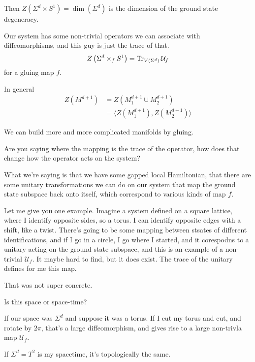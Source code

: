 Then $Z\left(\Sigma^d\times S^1 \right) = \dim\left(\Sigma^d \right)$
is the dimension of the ground state degeneracy.

Our system has some non-trivial operators
we can associate with diffeomorphisms,
and this guy is just the trace of that.
\begin{align}
    Z\left(\Sigma^d\times_f S^1 \right)
    = \Tr_{V\left(\Sigma^d \right)} \mathcal{U}_f
\end{align}
for a gluing map $f$.

In general
\begin{align}
    Z\left(M^{d+1} \right) &=
    Z\left( M_1^{d+1} \cup M_2^{d+1} \right)\\
    &=
    \langle
        Z(M_{1}^{d+1}), Z(M_{2}^{d+1})
    \rangle
\end{align}

We can build more and more complicated manifolds by gluing.

\begin{question}
    Are you saying where the mapping is the trace of the operator,
    how does that change how the operator acts on the system?
\end{question}
What we're saying is that we have some gapped local Hamiltonian,
that there are some unitary transformations we can do on our system
that map the ground state subspace back onto itself,
which correspond to various kinds of map $f$.

Let me give you one example.
Imagine a system defined on a square lattice,
where I identify opposite sides,
so a torus.
I can identify opposite edges with a shift, like a twist.
There's going to be some mapping between stsates of different identifications,
and if I go in a circle,
I go where I started,
and it corespodns to a unitary acting on the ground state subspace,
and this is an example of a non-trivial $\mathcal{U}_f$.
It maybe hard to find,
but it does exist.
The trace of the unitary defines for me this map.

That was not super concrete.

\begin{question}
    Is this space or space-time?
\end{question}
If our space was $\Sigma^d$ and suppose it was a torus.
If I cut my torus and cut,
and rotate by $2\pi$,
that's a large diffeomorphism,
and gives rise to a large non-trivla map $\mathcal{U}_f$.

If $\Sigma^d = T^2$ is my spacetime,
it's topologically the same.

